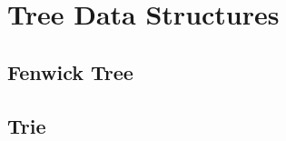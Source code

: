 
\chapter{Tree Data Structures}
\chapterinfo{}
	\section{Fenwick Tree}
	
	
	
	

	\section{Trie}
	
	
	
